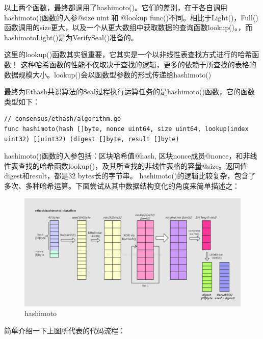\documentclass[UTF8]{ctexart}
\begin{document}
以上两个函数，最终都调用了hashimoto()。它们的差别，在于各自调用hashimoto()函数的入参@size uint 和 @lookup func()不同。相比于Light()，Full()函数调用的size更大，以及一个从更大数组中获取数据的查询函数lookup()。，而hashimotoLight()是为VerifySeal()准备的。

这里的lookup()函数其实很重要，它其实是一个以非线性表查找方式进行的哈希函数！ 这种哈希函数的性能不仅取决于查找的逻辑，更多的依赖于所查找的表格的数据规模大小。lookup()会以函数型参数的形式传递给hashimoto()


最终为Ethash共识算法的Seal过程执行运算任务的是hashimoto()函数，它的函数类型如下：

\begin{lstlisting}
// consensus/ethash/algorithm.go
func hashimoto(hash []byte, nonce uint64, size uint64, lookup(index uint32) []uint32) (digest []byte, result []byte)
\end{lstlisting}

hashimoto()函数的入参包括：区块哈希值@hash, 区块nonce成员@nonce，和非线性表查找的哈希函数lookup()，及其所查找的非线性表格的容量@size。返回值digest和result，都是32 bytes长的字节串。
hashimoto()的逻辑比较复杂，包含了多次、多种哈希运算。下面尝试从其中数据结构变化的角度来简单描述之：


\begin{figure}
	\centering
	\includegraphics[scale=0.3]{hashimoto.png}
	\caption{hashimoto}
	\label{hashimoto}
\end{figure}


简单介绍一下上图所代表的代码流程：
\end{document}
